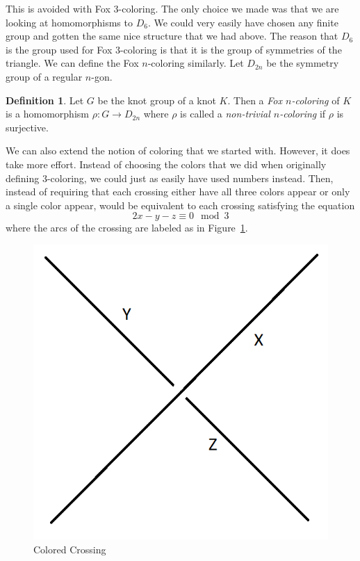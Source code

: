 \documentclass[12pt]{amsart}
\theoremstyle{definition}
\newtheorem{definition}[theorem]{Definition}
\theoremstyle{remark}
\numberwithin{equation}{section}
\newcommand{\ds}{.3}
\begin{document}
This is avoided with Fox $3$-coloring. The only choice we made
was that we are looking at homomorphisms to $D_6$. We could
very easily have chosen any finite group and gotten the
same nice structure that we had above. The reason that
$D_6$ is the group used for Fox $3$-coloring is that it is
the group of symmetries of the triangle. We can
define the Fox $n$-coloring similarly. Let $D_{2n}$ be
the symmetry group of a regular $n$-gon.

\begin{definition}
  Let $G$ be the knot group of a knot $K$. Then
  a \textit{Fox $n$-coloring} of $K$ is a homomorphism $\rho: G\rightarrow D_{2n}$
  where $\rho$ is called a \textit{non-trivial $n$-coloring} if $\rho$ is
  surjective.
\end{definition}

We can also extend the notion of coloring that we started
with. However, it does take more effort. Instead of choosing
the colors that we did when originally defining $3$-coloring,
we could just as easily have used numbers instead. Then,
instead of requiring that each crossing either have all three
colors appear or only a single color appear, would be equivalent to each
crossing satisfying the equation
\[
  2x-y-z\equiv 0 \mod 3
\]
where the arcs of the crossing are labeled as in Figure~\ref{fig:numcolor}.

\begin{figure}
  \includegraphics[scale=\ds]{numcolor}
  \caption{Colored Crossing}
  \label{fig:numcolor}
\end{figure}
\end{document}
